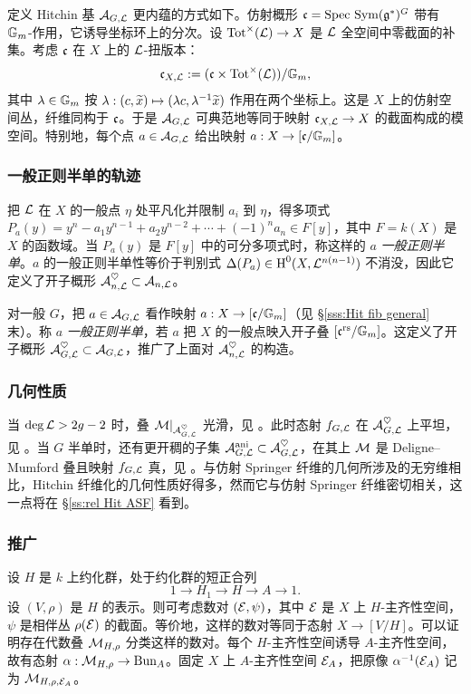 定义 Hitchin 基 $\mathcal{A}_{G,\mathcal{L}}$ 更内蕴的方式如下。仿射概形 $\mathfrak{c}=\textup{Spec}\  \textup{Sym}(\mathfrak{g}^{*})^{G}$ 带有 $\mathbb{G}_m$-作用，它诱导坐标环上的分次。设 $\textup{Tot}^{\times}(\mathcal{L})\to X$ 是 $\mathcal{L}$ 全空间中零截面的补集。考虑 $\mathfrak{c}$ 在 $X$ 上的 $\mathcal{L}$-扭版本：
\begin{equation*}
\mathfrak{c}_{X,\mathcal{L}}:=(\mathfrak{c}\times \textup{Tot}^{\times}(\mathcal{L}))/\mathbb{G}_m,
\end{equation*}
其中 $\lambda\in\mathbb{G}_m$ 按 $\lambda: (c,\widetilde{x})\mapsto (\lambda c, \lambda^{-1}\widetilde{x})$ 作用在两个坐标上。这是 $X$ 上的仿射空间丛，纤维同构于 $\mathfrak{c}$。于是 $\mathcal{A}_{G,\mathcal{L}}$ 可典范地等同于映射 $\mathfrak{c}_{X,\mathcal{L}}\to X$ 的截面构成的模空间。特别地，每个点 $a\in\mathcal{A}_{G,\mathcal{L}}$ 给出映射 $a:X\to [\mathfrak{c}/\mathbb{G}_m]$。

\subsubsection{一般正则半单的轨迹} 把 $\mathcal{L}$ 在 $X$ 的一般点 $\eta$ 处平凡化并限制 $a_{i}$ 到 $\eta$，得多项式 $P_{a}(y)=y^{n}-a_{1}y^{n-1}+a_{2}y^{n-2}+\cdots +(-1)^{n}a_{n}\in F[y]$，其中 $F=k(X)$ 是 $X$ 的函数域。当 $P_{a}(y)$ 是 $F[y]$ 中的可分多项式时，称这样的 $a$ {\em 一般正则半单}。$a$ 的一般正则半单性等价于判别式 $\Delta(P_{a})\in\textup{H}^{0}({X,\mathcal{L}^{n(n-1)}})$ 不消没，因此它定义了开子概形 $\mathcal{A}^{\heartsuit}_{n,\mathcal{L}}\subset \mathcal{A}_{n,\mathcal{L}}$。

对一般 $G$，把 $a\in\mathcal{A}_{G,\mathcal{L}}$ 看作映射 $a:X\to [\mathfrak{c}/\mathbb{G}_m]$（见 \S\ref{sss:Hit fib general} 末）。称 $a$ {\em 一般正则半单}，若 $a$ 把 $X$ 的一般点映入开子叠 $[\mathfrak{c}^{\textup{rs}}/\mathbb{G}_m]$。这定义了开子概形 $\mathcal{A}^{\heartsuit}_{G,\mathcal{L}}\subset\mathcal{A}_{G,\mathcal{L}}$，推广了上面对 $\mathcal{A}^{\heartsuit}_{n,\mathcal{L}}$ 的构造。

\subsubsection{几何性质}\label{sss:geom Hit} 当 $\deg \mathcal{L}>2g-2$ 时，叠 $\mathcal{M}|_{\mathcal{A}^{\heartsuit}_{G,\mathcal{L}}}$ 光滑，见 \cite[定理 4.14.1]{NgoFL}。此时态射 $f_{G,\mathcal{L}}$ 在 $\mathcal{A}^{\heartsuit}_{G,\mathcal{L}}$ 上平坦，见 \cite[推论 4.16.4]{NgoFL}。当 $G$ 半单时，还有更开稠的子集 $\mathcal{A}^{\textup{ani}}_{G,\mathcal{L}}\subset \mathcal{A}^{\heartsuit}_{G,\mathcal{L}}$，在其上 $\mathcal{M}$ 是 Deligne--Mumford 叠且映射 $f_{G,\mathcal{L}}$ 真，见 \cite[命题 6.1.3]{NgoFL}。与仿射 Springer 纤维的几何所涉及的无穷维相比，Hitchin 纤维化的几何性质好得多，然而它与仿射 Springer 纤维密切相关，这一点将在 \S\ref{ss:rel Hit ASF} 看到。

\subsubsection{推广}\label{sss:general Hitchin} 设 $H$ 是 $k$ 上约化群，处于约化群的短正合列
\begin{equation*}
1\to H_{1}\to H\to A\to 1.
\end{equation*}
设 $(V,\rho)$ 是 $H$ 的表示。则可考虑数对 $(\mathcal{E},\psi)$，其中 $\mathcal{E}$ 是 $X$ 上 $H$-主齐性空间，$\psi$ 是相伴丛 $\rho(\mathcal{E})$ 的截面。等价地，这样的数对等同于态射 $X\to [V/H]$。可以证明存在代数叠 $\mathcal{M}_{H, \rho}$ 分类这样的数对。每个 $H$-主齐性空间诱导 $A$-主齐性空间，故有态射 $\alpha: \mathcal{M}_{H, \rho}\to \textup{Bun}_{A}$。固定 $X$ 上 $A$-主齐性空间 $\mathcal{E}_{A}$，把原像 $\alpha^{-1}(\mathcal{E}_{A})$ 记为 $\mathcal{M}_{H,\rho,\mathcal{E}_{A}}$。

